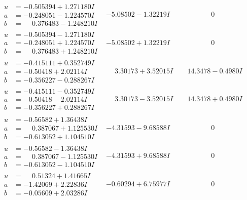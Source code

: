 \documentclass[1p]{elsarticle_modified}
\theoremstyle{definition}
\begin{document}
$$\begin{array}{c|c|c}
\begin{aligned}
u &= -0.505394 + 1.271180 I \\
a &= -0.248051 - 1.224570 I \\
b &= \phantom{-}0.376483 - 1.248210 I\end{aligned}
 & -5.08502 - 1.32219 I & \phantom{-0.000000 } 0 \\ \hline\begin{aligned}
u &= -0.505394 - 1.271180 I \\
a &= -0.248051 + 1.224570 I \\
b &= \phantom{-}0.376483 + 1.248210 I\end{aligned}
 & -5.08502 + 1.32219 I & \phantom{-0.000000 } 0 \\ \hline\begin{aligned}
u &= -0.415111 + 0.352749 I \\
a &= -0.50418 + 2.02114 I \\
b &= -0.356227 - 0.288267 I\end{aligned}
 & \phantom{-}3.30173 + 3.52015 I & \phantom{-}14.3478 - 0.4980 I \\ \hline\begin{aligned}
u &= -0.415111 - 0.352749 I \\
a &= -0.50418 - 2.02114 I \\
b &= -0.356227 + 0.288267 I\end{aligned}
 & \phantom{-}3.30173 - 3.52015 I & \phantom{-}14.3478 + 0.4980 I \\ \hline\begin{aligned}
u &= -0.56582 + 1.36438 I \\
a &= \phantom{-}0.387067 + 1.125530 I \\
b &= -0.613052 + 1.104510 I\end{aligned}
 & -4.31593 - 9.68588 I & \phantom{-0.000000 } 0 \\ \hline\begin{aligned}
u &= -0.56582 - 1.36438 I \\
a &= \phantom{-}0.387067 - 1.125530 I \\
b &= -0.613052 - 1.104510 I\end{aligned}
 & -4.31593 + 9.68588 I & \phantom{-0.000000 } 0 \\ \hline\begin{aligned}
u &= \phantom{-}0.51324 + 1.41665 I \\
a &= -1.42069 + 2.22836 I \\
b &= -0.05609 + 2.03286 I\end{aligned}
 & -0.60294 + 6.75977 I & \phantom{-0.000000 } 0 \\ \hline\begin{aligned}

\end{aligned}
\end{array}$$
\end{document}

